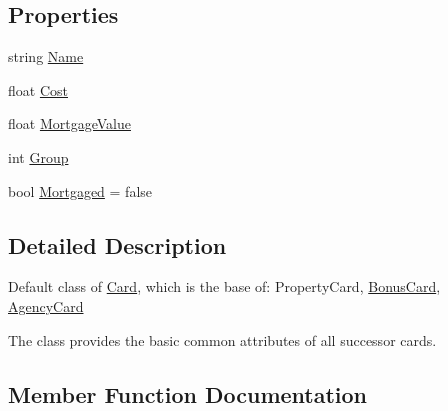 \subsection*{Properties}
\begin{DoxyCompactItemize}
\item 
string \mbox{\hyperlink{class_monopoly_1_1_cards_1_1_card_ac114f0ec54d1b86154e9c596c3980003}{Name}}
\item 
float \mbox{\hyperlink{class_monopoly_1_1_cards_1_1_card_a67df91aa53596b2ce61ef2c3386ddd7c}{Cost}}
\item 
float \mbox{\hyperlink{class_monopoly_1_1_cards_1_1_card_adb2af81dda38706437f368b088c9b1a6}{Mortgage\+Value}}
\item 
int \mbox{\hyperlink{class_monopoly_1_1_cards_1_1_card_a90d55a4790f3d8afeba0203b70fa2086}{Group}}
\item 
bool \mbox{\hyperlink{class_monopoly_1_1_cards_1_1_card_a5569d582a0692b3a37c81dd2320cc367}{Mortgaged}} = false
\end{DoxyCompactItemize}


\subsection{Detailed Description}
Default class of \mbox{\hyperlink{class_monopoly_1_1_cards_1_1_card}{Card}}, which is the base of\+: Property\+Card, \mbox{\hyperlink{class_monopoly_1_1_cards_1_1_bonus_card}{Bonus\+Card}}, \mbox{\hyperlink{class_monopoly_1_1_cards_1_1_agency_card}{Agency\+Card}}

The class provides the basic common attributes of all successor cards. 

\subsection{Member Function Documentation}
\mbox{\label{class_monopoly_1_1_cards_1_1_card_a3a30376e286fdae69bf7c77cd6620fe3}} 
